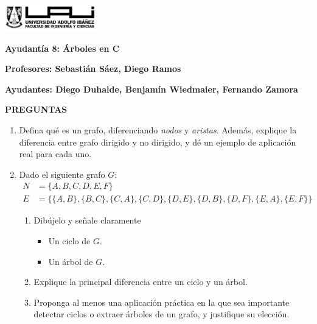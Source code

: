 \documentclass[12pt]{article}
\begin{document}
    \begin{titlepage}
        \centering
        \includegraphics[width=0.3\textwidth]{../imgs/logo-uai-fic.png}

        \vspace{0.5cm}
        \textbf{\fontsize{12}{24} Ayudantía 8: Árboles en C}

        \vspace{0.5cm}
        \textbf{\fontsize{12}{24}\selectfont Profesores: Sebastián Sáez, Diego Ramos}

        \begin{center}
            \textbf{\fontsize{12}{24}\selectfont Ayudantes: Diego Duhalde, Benjamín Wiedmaier, Fernando Zamora}
        \end{center}
        \begin{center}
            \textbf{PREGUNTAS}
        \end{center}

        \begin{enumerate}[leftmargin=*]
            \item Defina qué es un grafo, diferenciando \emph{nodos} y \emph{aristas}. Además, explique la diferencia entre grafo dirigido y no dirigido, y dé un ejemplo de aplicación real para cada uno.

            \item Dado el siguiente grafo $G$:
            \begin{align*}
                N &= \{ A, B, C, D, E, F\} \\
                E &= \{ \{A, B\}, \{B, C\}, \{C, A\}, \{C, D\}, \{D, E\}, \{D, B\}, \{D, F\}, \{E, A\}, \{E, F\} \}
            \end{align*}
            \begin{enumerate}[label=\alph*)]
                \item Dibújelo y señale claramente
                \begin{itemize}
                    \item Un ciclo de $G$.
                    \item Un árbol de $G$.
                \end{itemize}
                \item Explique la principal diferencia entre un ciclo y un árbol.
                \item Proponga al menos una aplicación práctica en la que sea importante detectar ciclos o extraer árboles de un grafo, y justifique su elección.
            \end{enumerate}
            

\end{enumerate}
\end{titlepage}
\end{document}
